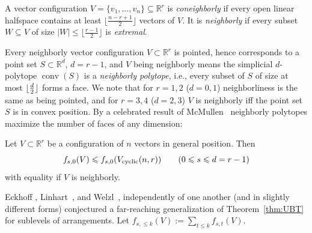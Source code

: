 \documentclass[a4paper,USenglish,cleveref, autoref, thm-restate,nolineno]{socg-lipics-v2021}
\DeclareMathOperator{\conv}{conv}
\renewcommand{\leq}{\leqslant}
\newcommand{\R}{\mathbb{R}}
\DeclarePairedDelimiter\floor{\lfloor}{\rfloor}
\newcommand{\cyclic}{V_{\textup{cyclic}}}
\begin{document}
\begin{definition} A vector configuration 
$V=\{v_1,\dots,v_n\} \subseteq \R^r$ is \emph{coneighborly} if every open linear halfspace contains at least $\lfloor \frac{n-r+1}{2} \rfloor$ vectors of $V$. 
It is \emph{neighborly} if every subset $W \subseteq V$ of size $|W| \leq \lfloor \frac{r-1}{2} \rfloor$ is \emph{extremal}.
\end{definition}
Every neighborly vector configuration $V \subset \R^r$ is pointed, hence corresponds to a point set $S\subset \R^d$, $d=r-1$, and $V$ being neighborly means the simplicial $d$-polytope $\conv(S)$ is a \emph{neighborly polytope}, i.e., every subset of $S$ of size at most $\floor{\frac{d}{2}}$ forms a face. 
We note that for $r=1,2$ ($d=0,1$) neighborliness is the same as being pointed, and for $r=3,4$ ($d=2,3$) $V$ is neighborly iff the point set $S$ is in convex position. By a celebrated result of McMullen~\cite{McMullen:1970aa} neighborly polytopes maximize the number of faces of any dimension:

\begin{theorem} 
\label{thm:UBT}
Let $V \subset \R^r$ be a configuration of $n$ vectors in general position. Then
\[
f_{s,0}(V) \leq f_{s,0}(\cyclic(n,r)) \qquad (0 \leq s \leq d=r-1)
\]
with equality if $V$ is neighborly.
\end{theorem}
Eckhoff \cite[Conj.~9.8]{Eckhoff:1993aa}, Linhart~\cite{Linhart:1994aa}, and Welzl~\cite{Welzl:2001aa}, independently of one another (and in slightly different forms) conjectured a far-reaching generalization of Theorem~\ref{thm:UBT} for sublevels of arrangements. Let $f_{s,\leq k}(V):=\sum_{t\leq k}f_{s,t}(V)$.
\end{document}
